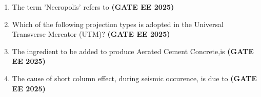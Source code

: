 \documentclass[journal,12pt,onecolumn]{IEEEtran}
\theoremstyle{remark}
\begin{document}
\begin{enumerate}
\begin{enumerate}
\end{enumerate}
\item The term 'Necropolis' refers to \hfill \textbf{(GATE EE 2025)}
\begin{enumerate}
\end{enumerate}
\item Which of the following projection types is adopted in the Universal Transverse Mercator (UTM)? \hfill \textbf{(GATE EE 2025)}
\begin{enumerate}
\end{enumerate}
\item The ingredient to be added to produce Aerated Cement Concrete,is \hfill \textbf{(GATE EE 2025)}
\begin{enumerate}
\end{enumerate}
\item The cause of short column effect, during seismic occurence, is due to \hfill \textbf{(GATE EE 2025)}
\begin{enumerate}
\end{enumerate}
\end{enumerate}
\end{document}
